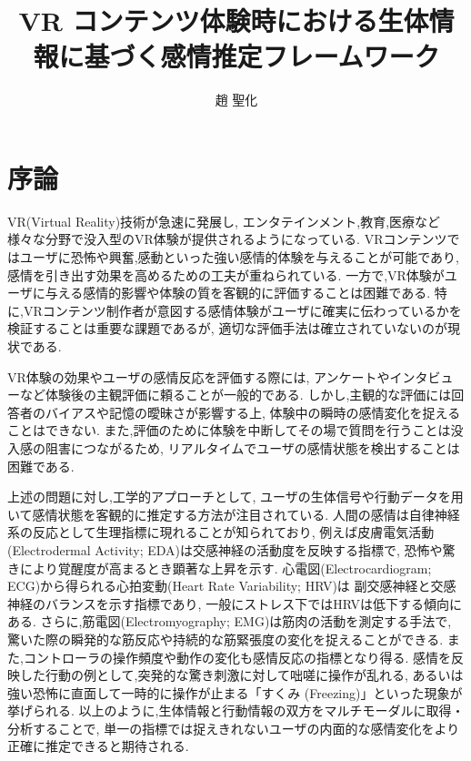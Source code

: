 \documentclass[book,paper=a4,fontsize=10pt,jafontscale=0.92]{jlreq}
\title{VR コンテンツ体験時における生体情報に基づく感情推定フレームワーク} %
\author{趙 聖化} %
\begin{document}

\jtitlepage %
\clearpage %
\jabstractpage %
\clearpage %
\tableofcontents %
\clearpage %
\listoftables %
\clearpage %
\listoffigures %
\clearpage %

\chapter{序論}

VR(Virtual Reality)技術が急速に発展し,
エンタテインメント,教育,医療など様々な分野で没入型のVR体験が提供されるようになっている.
VRコンテンツではユーザに恐怖や興奮,感動といった強い感情的体験を与えることが可能であり,
感情を引き出す効果を高めるための工夫が重ねられている.
一方で,VR体験がユーザに与える感情的影響や体験の質を客観的に評価することは困難である.
特に,VRコンテンツ制作者が意図する感情体験がユーザに確実に伝わっているかを検証することは重要な課題であるが,
適切な評価手法は確立されていないのが現状である.

VR体験の効果やユーザの感情反応を評価する際には,
アンケートやインタビューなど体験後の主観評価に頼ることが一般的である.
しかし,主観的な評価には回答者のバイアスや記憶の曖昧さが影響する上,
体験中の瞬時の感情変化を捉えることはできない.
また,評価のために体験を中断してその場で質問を行うことは没入感の阻害につながるため,
リアルタイムでユーザの感情状態を検出することは困難である.

上述の問題に対し,工学的アプローチとして,
ユーザの生体信号や行動データを用いて感情状態を客観的に推定する方法が注目されている.
人間の感情は自律神経系の反応として生理指標に現れることが知られており,
例えば皮膚電気活動(Electrodermal Activity; EDA)は交感神経の活動度を反映する指標で,
恐怖や驚きにより覚醒度が高まるとき顕著な上昇を示す.
心電図(Electrocardiogram; ECG)から得られる心拍変動(Heart Rate Variability; HRV)は
副交感神経と交感神経のバランスを示す指標であり,
一般にストレス下ではHRVは低下する傾向にある\cite{MarinMorales2020, OrozcoMora2024}.
さらに,筋電図(Electromyography; EMG)は筋肉の活動を測定する手法で,
驚いた際の瞬発的な筋反応や持続的な筋緊張度の変化を捉えることができる.
また,コントローラの操作頻度や動作の変化も感情反応の指標となり得る.
感情を反映した行動の例として,突発的な驚き刺激に対して咄嗟に操作が乱れる,
あるいは強い恐怖に直面して一時的に操作が止まる「すくみ (Freezing)」といった現象が挙げられる.
以上のように,生体情報と行動情報の双方をマルチモーダルに取得・分析することで,
単一の指標では捉えきれないユーザの内面的な感情変化をより正確に推定できると期待される.
\end{document}
